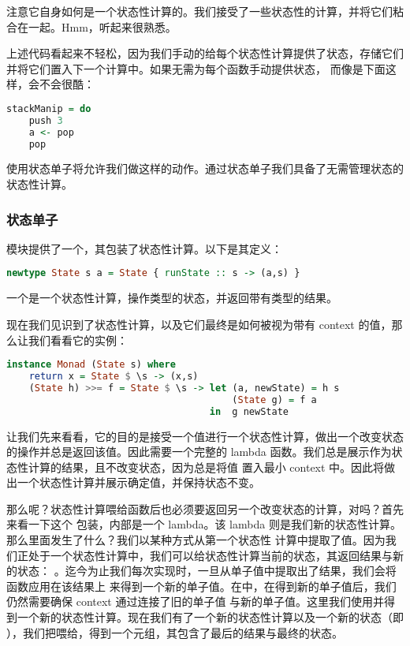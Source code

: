 \documentclass[./main.tex]{subfiles}
\begin{document}
注意它自身如何是一个状态性计算的。我们接受了一些状态性的计算，并将它们粘合在一起。Hmm，听起来很熟悉。

上述代码看起来不轻松，因为我们手动的给每个状态性计算提供了状态，存储它们并将它们置入下一个计算中。如果无需为每个函数手动提供状态，
而像是下面这样，会不会很酷：

\begin{lstlisting}[language=Haskell]
  stackManip = do
    push 3
    a <- pop
    pop
\end{lstlisting}

使用状态单子将允许我们做这样的动作。通过状态单子我们具备了无需管理状态的状态性计算。

\subsubsection*{状态单子}

模块提供了一个，其包装了状态性计算。以下是其定义：

\begin{lstlisting}[language=Haskell]
  newtype State s a = State { runState :: s -> (a,s) }
\end{lstlisting}

一个是一个状态性计算，操作类型的状态，并返回带有类型的结果。

现在我们见识到了状态性计算，以及它们最终是如何被视为带有 context 的值，那么让我们看看它的实例：

\begin{lstlisting}[language=Haskell]
  instance Monad (State s) where
    return x = State $ \s -> (x,s)
    (State h) >>= f = State $ \s -> let (a, newState) = h s
                                        (State g) = f a
                                    in  g newState
\end{lstlisting}

让我们先来看看，它的目的是接受一个值进行一个状态性计算，做出一个改变状态的操作并总是返回该值。因此需要一个完整的
lambda 函数。我们总是展示作为状态性计算的结果，且不改变状态，因为总是将值
置入最小 context 中。因此将做出一个状态性计算并展示确定值，并保持状态不变。

那么\acode{>>=}呢？状态性计算喂给\acode{>>=}函数后也必须要返回另一个改变状态的计算，对吗？首先来看一下这个
包装，内部是一个 lambda。该 lambda 则是我们新的状态性计算。那么里面发生了什么？我们以某种方式从第一个状态性
计算中提取了值。因为我们正处于一个状态性计算中，我们可以给状态性计算当前的状态，其返回结果与新的状态：
。迄今为止我们每次实现\acode{>>=}时，一旦从单子值中提取出了结果，我们会将函数应用在该结果上
来得到一个新的单子值。在中，在得到新的单子值后，我们仍然需要确保 context 通过连接了旧的单子值
与新的单子值。这里我们使用并得到一个新的状态性计算。现在我们有了一个新的状态性计算以及一个新的状态（即
），我们把喂给，得到一个元组，其包含了最后的结果与最终的状态。
\end{document}
